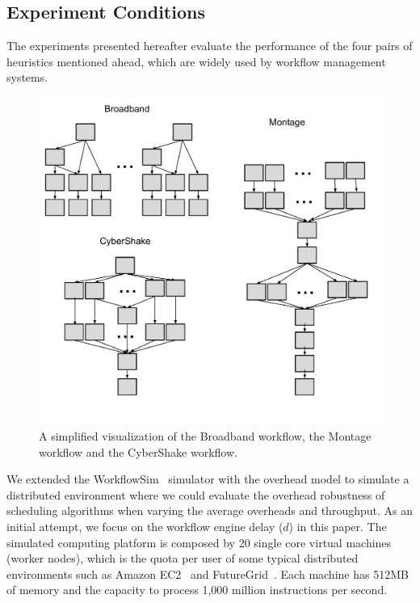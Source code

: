 \subsection{Experiment Conditions}


The experiments presented hereafter evaluate the performance of the four pairs of heuristics mentioned ahead, which are widely used by workflow management systems. 

\begin{figure}[htb]
	\centering
	\includegraphics[width=1.0\linewidth]{figures/sensitivity/shape.pdf} 
	\caption{A simplified visualization of the Broadband workflow, the Montage workflow and the CyberShake workflow.}
	\label{fig:sensitivity_shape}
\end{figure}

We extended the WorkflowSim~\cite{Chen2012a} simulator with the overhead model to simulate a distributed environment where we could evaluate the overhead robustness of scheduling algorithms when varying the average overheads and throughput. As an initial attempt, we focus on the workflow engine delay ($d$) in this paper. The simulated computing platform is composed by 20 single core virtual machines (worker nodes), which is the quota per user of some typical distributed environments such as Amazon EC2~\cite{AmazonAWS} and FutureGrid~\cite{FutureGrid}. Each machine has 512MB of memory and the capacity to process 1,000 million instructions per second. 



